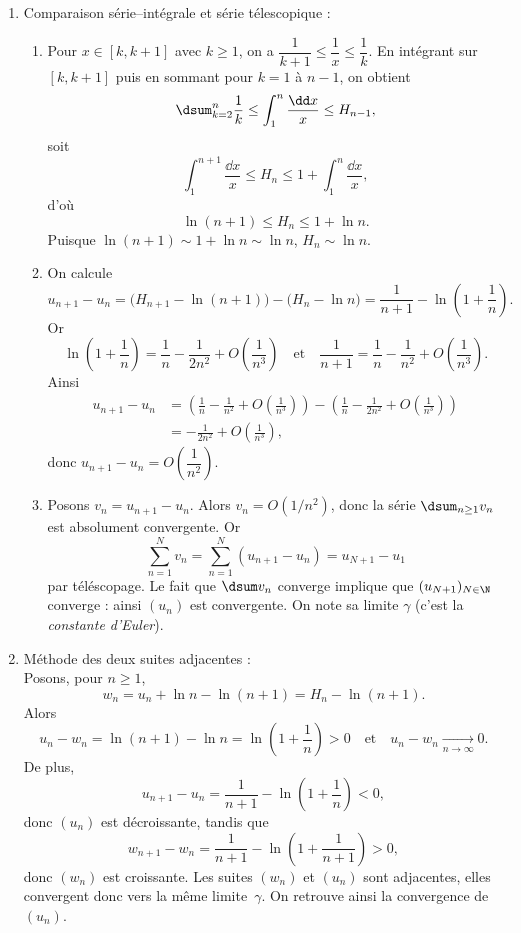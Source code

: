 \begin{enumerate}[label=\textbf{\alph*.}]
\item Comparaison série--intégrale et série télescopique :

\begin{enumerate}[label=\textbf{\arabic*.}]

\item
Pour $x\in[k,k+1]$ avec $k\ge1$, on a $\dfrac1{k+1}\le \dfrac1x\le \dfrac1k$. En intégrant sur $[k,k+1]$ puis en sommant pour $k=1$ à $n-1$, on obtient
\[
\dsum_{k=2}^n \dfrac{1}{k}\leq \int_1^n \dfrac{\dd x}{x} \le H_{n-1} ,
\]
soit
\[
\int_1^{n+1} \dfrac{\dd x}{x} \le H_{n} \le 1+\int_1^n \dfrac{\dd x}{x},
\]
d'où
\[
\ln (n+1) \le H_n \le 1+\ln n.
\]
Puisque $\ln(n+1)\sim 1+\ln n\sim \ln n$, $H_n\sim \ln n$.

\item
On calcule
\[
u_{n+1}-u_n
= \bigl(H_{n+1}-\ln(n+1)\bigr) - \bigl(H_n - \ln n\bigr)
= \frac1{n+1} - \ln\!\left(1+\frac1n\right).
\]
Or
\[
\ln\!\left(1+\frac1n\right) = \frac1n - \frac{1}{2n^2} + O\!\left(\frac1{n^3}\right)
\quad\text{et}\quad
\frac1{n+1} = \frac1n - \frac1{n^2} + O\!\left(\frac1{n^3}\right).
\]
Ainsi
\begin{align*}
u_{n+1}-u_n
&= \left(\frac1n - \frac1{n^2} + O\!\left(\frac1{n^3}\right)\right)
  - \left(\frac1n - \frac{1}{2n^2} + O\!\left(\frac1{n^3}\right)\right)\\
&= -\frac{1}{2n^2} + O\!\left(\frac1{n^3}\right),
\end{align*}
donc $u_{n+1}-u_n = O\!\left(\dfrac1{n^2}\right)$.

\item
Posons $v_n = u_{n+1}-u_n$. Alors $v_n = O(1/n^2)$, donc la série $\dsum_{n\ge1} v_n$ est absolument convergente. Or
\[
\sum_{n=1}^{N} v_n = \sum_{n=1}^{N} (u_{n+1}-u_n) = u_{N+1}-u_1
\]
par téléscopage. Le fait que $\dsum v_n$ converge implique que $(u_{N+1})_{N\in\N}$ converge : ainsi $(u_n)$ est convergente. On note sa limite $\gamma$ (c'est la \emph{constante d'Euler}).
\end{enumerate}

\item Méthode des deux suites adjacentes :\\

Posons, pour $n\ge1$,
\[
w_n = u_n + \ln n - \ln(n+1) = H_n - \ln(n+1).
\]
Alors
\[
u_n - w_n = \ln(n+1) - \ln n = \ln\!\left(1+\frac1n\right) > 0
\quad\text{et}\quad
u_n - w_n \xrightarrow[n\to\infty]{} 0.
\]
De plus,
\[
u_{n+1}-u_n = \frac1{n+1} - \ln\!\left(1+\frac1n\right) < 0,
\]
donc $(u_n)$ est décroissante, tandis que
\[
w_{n+1}-w_n = \frac1{n+1} - \ln\!\left(1+\frac1{n+1}\right) > 0,
\]
donc $(w_n)$ est croissante. Les suites $(w_n)$ et $(u_n)$ sont adjacentes, elles convergent donc vers la même limite~$\gamma$. On retrouve ainsi la convergence de $(u_n)$.

\end{enumerate}

